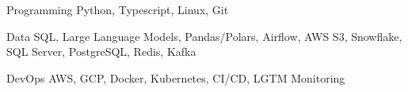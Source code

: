 

\begin{cvskills}

  \cvskill
    {Programming} %
    {Python, Typescript, Linux, Git} %
    
  \cvskill
    {Data} %
    {SQL, Large Language Models, Pandas/Polars, Airflow, AWS S3, Snowflake, SQL Server, PostgreSQL, Redis, Kafka} %
        
  \cvskill
    {DevOps} %
    {AWS, GCP, Docker, Kubernetes, CI/CD, LGTM Monitoring} %

\end{cvskills}
